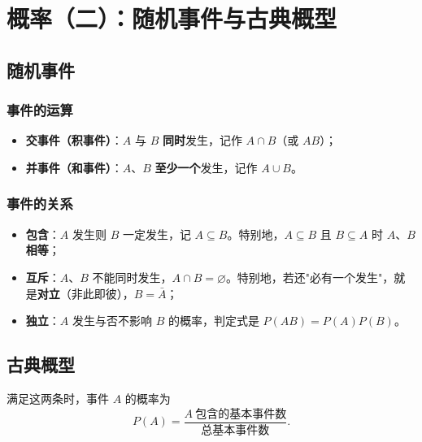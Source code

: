 \chapter{概率（二）：随机事件与古典概型}

\section{随机事件}

\subsection*{事件的运算}

\begin{itemize}
    \item \textbf{交事件（积事件）}：$A$ 与 $B$ \textbf{同时}发生，记作 $A\cap B$（或 $AB$）；
    \item \textbf{并事件（和事件）}：$A$、$B$ \textbf{至少一个}发生，记作 $A\cup B$。
\end{itemize}

\subsection*{事件的关系}

\begin{itemize}
    \item \textbf{包含}：$A$ 发生则 $B$ 一定发生，记 $A\subseteq B$。特别地，$A\subseteq B$ 且 $B\subseteq A$ 时 $A$、$B$ \textbf{相等}；
    \item \textbf{互斥}：$A$、$B$ 不能同时发生，$A\cap B=\varnothing$。特别地，若还"必有一个发生"，就是\textbf{对立}（非此即彼），$B=\bar{A}$；
    \item \textbf{独立}：$A$ 发生与否不影响 $B$ 的概率，判定式是 $P(AB)=P(A)P(B)$。
\end{itemize}

\section{古典概型}


满足这两条时，事件 $A$ 的概率为
\[
P(A)=\frac{A\ \text{包含的基本事件数}}{\text{总基本事件数}}.
\]

